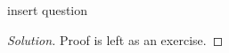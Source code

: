 \begin{solution}{4.2}
    \begin{question}[]
        insert question    
    \end{question}
    \tcblower{}
    \begin{proof}[Solution]
        Proof is left as an exercise.
    \end{proof}
\end{solution}
